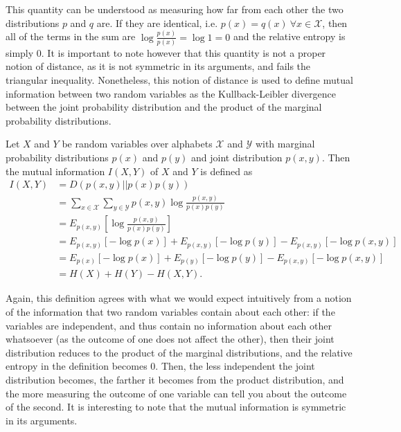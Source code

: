 This quantity can be understood as measuring how far from each other the two distributions $p$ and $q$ are. If they are identical, i.e. $p(x) = q(x) \: \forall x \in \mathcal{X}$, then all of the terms in the sum are $\log \frac{p(x)}{p(x)} = \log 1 = 0$ and the relative entropy is simply 0. It is important to note however that this quantity is not a proper notion of distance, as it is not symmetric in its arguments, and fails the triangular inequality. %
Nonetheless, this notion of distance is used to define mutual information between two random variables as the Kullback-Leibler divergence between the joint probability distribution and the product of the marginal probability distributions.

\begin{appendix_definition}
    Let $X$ and $Y$ be random variables over alphabets $\mathcal{X}$ and $\mathcal{Y}$ with marginal probability distributions $p(x)$ and $p(y)$ and joint distribution $p(x, y)$. Then the mutual information $I(X, Y)$ of $X$ and $Y$ is defined as
    \begin{align}
        I(X, Y) &= D(p(x, y)||p(x)p(y))\\
                &= \sum_{x \in \mathcal{X}} \sum_{y \in \mathcal{Y}} p(x, y) \log \frac{p(x, y)}{p(x)p(y)}\\
                &= E_{p(x, y)}\left[\log \frac{p(x, y)}{p(x)p(y)}\right]\\
                &= E_{p(x, y)}[- \log p(x)] + E_{p(x, y)}[- \log p(y)] - E_{p(x, y)}[- \log p(x, y)]\\
                &= E_{p(x)}[- \log p(x)] + E_{p(y)}[- \log p(y)] - E_{p(x, y)}[- \log p(x, y)]\\
                &= H(X) + H(Y) - H(X, Y).
    \end{align}
\end{appendix_definition}

Again, this definition agrees with what we would expect intuitively from a notion of the information that two random variables contain about each other: if the variables are independent, and thus contain no information about each other whatsoever (as the outcome of one does not affect the other), then their joint distribution reduces to the product of the marginal distributions, and the relative entropy in the definition becomes 0. Then, the less independent the joint distribution becomes, the farther it becomes from the product distribution, and the more measuring the outcome of one variable can tell you about the outcome of the second. It is interesting to note that the mutual information is symmetric in its arguments.

